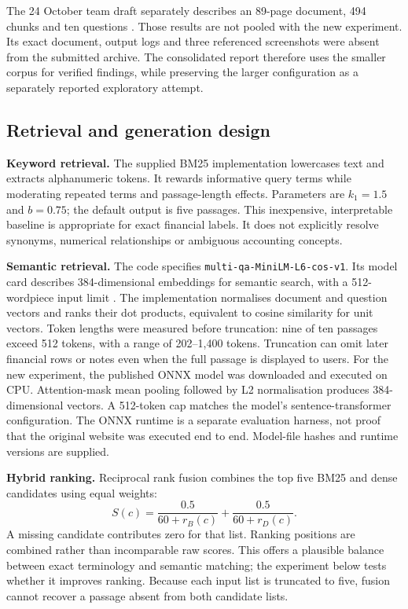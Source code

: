 \documentclass[11pt,a4paper]{article}
\begin{document}
The 24 October team draft separately describes an 89-page document, 494 chunks and ten questions \cite{vijay}. Those results are not pooled with the new experiment. Its exact document, output logs and three referenced screenshots were absent from the submitted archive. The consolidated report therefore uses the smaller corpus for verified findings, while preserving the larger configuration as a separately reported exploratory attempt.

\subsection{Retrieval and generation design}
\textbf{Keyword retrieval.} The supplied BM25 implementation lowercases text and extracts alphanumeric tokens. It rewards informative query terms while moderating repeated terms and passage-length effects. Parameters are $k_1=1.5$ and $b=0.75$; the default output is five passages. This inexpensive, interpretable baseline is appropriate for exact financial labels. It does not explicitly resolve synonyms, numerical relationships or ambiguous accounting concepts.

\textbf{Semantic retrieval.} The code specifies \texttt{multi-qa-MiniLM-L6-cos-v1}. Its model card describes 384-dimensional embeddings for semantic search, with a 512-wordpiece input limit \cite{minilm}. The implementation normalises document and question vectors and ranks their dot products, equivalent to cosine similarity for unit vectors. Token lengths were measured before truncation: nine of ten passages exceed 512 tokens, with a range of 202--1,400 tokens. Truncation can omit later financial rows or notes even when the full passage is displayed to users. For the new experiment, the published ONNX model was downloaded and executed on CPU. Attention-mask mean pooling followed by L2 normalisation produces 384-dimensional vectors. A 512-token cap matches the model's sentence-transformer configuration. The ONNX runtime is a separate evaluation harness, not proof that the original website was executed end to end. Model-file hashes and runtime versions are supplied.

\textbf{Hybrid ranking.} Reciprocal rank fusion combines the top five BM25 and dense candidates using equal weights:
\begin{equation}
S(c)=\frac{0.5}{60+r_B(c)}+\frac{0.5}{60+r_D(c)}.
\end{equation}
A missing candidate contributes zero for that list. Ranking positions are combined rather than incomparable raw scores. This offers a plausible balance between exact terminology and semantic matching; the experiment below tests whether it improves ranking. Because each input list is truncated to five, fusion cannot recover a passage absent from both candidate lists.
\end{document}
